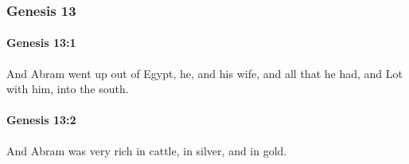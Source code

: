 	\subsubsection{Genesis 13} %
		\label{GENESIS-13}

		\paragraph{Genesis 13:1} %
			\label{GENESIS-13-1}

			And Abram went up out of Egypt, he, and his wife, and all that he had, and Lot with him, into the south.


		\paragraph{Genesis 13:2} %
			\label{GENESIS-13-2}

			And Abram was very rich in cattle, in silver, and in gold.

